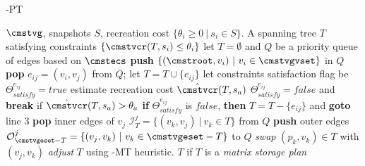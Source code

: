 \documentclass[conference]{IEEEtran}
\begin{document}
\begin{algorithm}[t!] 
\caption{\weightstore-PT}
\label{alg:pas_pt}{\small{
\begin{algorithmic}[1]
\REQUIRE $\cmstvg$, snapshots $S$, recreation cost $\{\theta_i \geq 0\ |\ s_i \in S\}$.
\ENSURE A spanning tree $T$ satisfying constraints $\{\cmstvcr(T, s_i) \leq \theta_i\}$
\STATE let $T = \emptyset$ and $Q$ be a priority queue of edges based on $\cmstecs$
\STATE \textbf{push} $\{(\cmstroot, v_i)\ |\ v_i \in \cmstvgvset\} $ in $Q$
\STATE \textbf{pop} $e_{ij} = (v_i, v_j)$ from $Q$; let $T = T \cup \{e_{ij}\}$
\STATE let constraints satisfaction flag be $\Theta^{e_{ij}}_{satisfy} = true$
\STATE estimate recreation cost $\hat\cmstvcr(T, s_a)$%
\STATE $\Theta^{e_{ij}}_{satisfy} = false$ and \textbf{break} if $\hat\cmstvcr(T, s_a) > \theta_a$
\ENDFOR
\STATE \textbf{if} $\Theta^{e_{ij}}_{satisfy}$ is $false$, \textbf{then} $T = T - \{e_{ij}\}$ and \textbf{goto} line 3
\STATE \textbf{pop} inner edges of $v_j$ $\mathcal{I}^j_T = \{(v_k, v_j)\ |\ v_k \in T\}$ from $Q$
\STATE \textbf{push} outer edges $\mathcal{O}^j_{\cmstvgeset - T} = \{(v_j, v_k)\ |\ v_k \in \cmstvgeset - T\}$ to $Q$
\STATE \emph{swap} $(p_k, v_k) \in T$ with $(v_j, v_k)$
\ENDFOR
\ENDWHILE
{}
\STATE \emph{adjust} $T$ using \weightstore-MT heuristic. 
\ENDIF
\RETURN $T$ if $T$ is a \emph{matrix storage plan}
\end{algorithmic}
}}
\end{algorithm}
\end{document}
